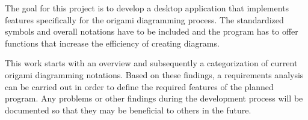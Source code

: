 The goal for this project is to develop a desktop application that implements features specifically for the origami diagramming process. The standardized symbols and overall notations have to be included and the program has to offer functions that increase the efficiency of creating diagrams.

This work starts with an overview and subsequently a categorization of current origami diagramming notations. Based on these findings, a requirements analysis can be carried out in order to define the required features of the planned program. Any problems or other findings during the development process will be documented so that they may be beneficial to others in the future.